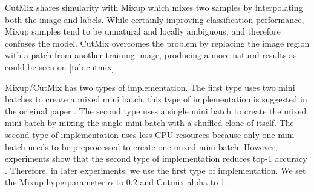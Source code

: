 

CutMix shares simularity with Mixup which mixes two samples by interpolating both the image and labels. While certainly improving classification performance, Mixup samples tend to be unnatural and locally ambiguous, and therefore confuses the model. CutMix overcomes the problem by replacing the image region with a patch from another training image, producing a more natural results as could be seen on \ref{tab:cutmix}

Mixup/CutMix has two types of implementation. The first type uses two mini batches to create a mixed mini batch. this type of implementation is suggested in the original paper \cite{zhang2017_mixup}. The second type uses a single mini batch to create the mixed mini batch by mixing the single mini batch with a shuffled clone of itself. The second type of implementation uses less CPU resources because only one mini batch needs to be preprocessed to create one mixed mini batch. However, experiments show that the second type of implementation reduces top-1 accuracy \cite{lee2020_compounding_improvements}. Therefore, in later experiments, we use the first type of implementation. We set the Mixup hyperparameter $\alpha$ to 0.2 and Cutmix alpha to 1. 










